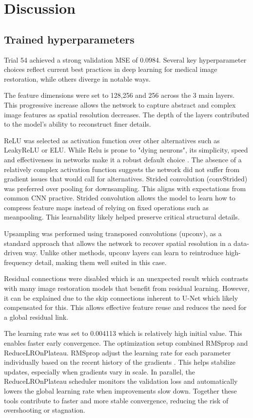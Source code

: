 \documentclass[twocolumn]{article}
\begin{document}
\section{Discussion}

\subsection{Trained hyperparameters}
Trial 54 achieved a strong validation MSE of 0.0984. Several key hyperparameter choices reflect current best practices in deep learning for medical image restoration, while others diverge in notable ways. 

The feature dimensions were set to 128,256 and 256 across the 3 main layers. This progressive increase allows the network to capture abstract and complex image features as spatial resolution decreases. The depth of the layers contributed to the model's ability to reconstruct finer details.

ReLU was selected as activation function over other alternatives such as LeakyReLU or ELU. While Relu is prone to "dying neurons", its simplicity, speed and effectiveness in networks make it a robust default choice \cite{relu}. The absence of a relatively complex activation function suggests the network did not suffer from gradient issues that would call for alternatives. 
Strided convolution (convStrided) was preferred over pooling for downsampling. This aligns with expectations from common CNN practive. Strided convolution allows the model to learn how to compress feature maps instead of relying on fixed operations such as meanpooling. This learnability likely helped preserve critical structural details. 

Upsampling was performed using transposed convolutions (upconv), as a standard approach that allows the network to recover spatial resolution in a data-driven way. Unlike other methods, upconv layers can learn to reintroduce high-frequency detail, making them well suited in this case.

Residual connections were disabled which is an unexpected result which contrasts with many image restoration models that benefit from residual learning. However, it can be explained due to the skip connections inherent to U-Net which likely compensated for this. This allows effective feature reuse and reduces the need for a global residual link.

The learning rate was set to 0.004113 which is relatively high initial value. This enables faster early convergence. The optimization setup combined RMSprop and ReduceLROnPlateau. RMSprop adjust the learning rate for each parameter individually based on the recent history of the gradients \cite{9036442}.  This helps stabilize updates, especially when gradients vary in scale. In parallel, the ReduceLROnPlateau scheduler monitors the validation loss and automatically lowers the global learning rate when improvements slow down. Together these tools contribute to faster and more stable convergence, reducing the risk of overshooting or stagnation.
\end{document}
